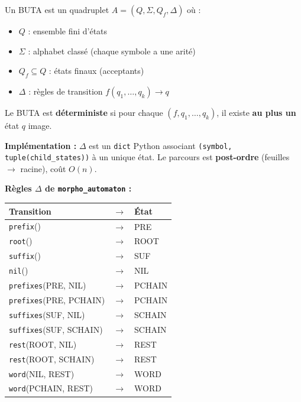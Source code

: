 \documentclass[12pt,a4paper,oneside]{scrartcl}
\begin{document}
\begin{definitionbox}
Un BUTA est un quadruplet $A = (Q, \Sigma, Q_f, \Delta)$ où :
\begin{itemize}
    \item $Q$ : ensemble fini d'états
    \item $\Sigma$ : alphabet classé (chaque symbole a une arité)
    \item $Q_f \subseteq Q$ : états finaux (acceptants)
    \item $\Delta$ : règles de transition $f(q_1, \dots, q_k) \to q$
\end{itemize}
Le BUTA est \textbf{déterministe} si pour chaque $(f, q_1, \dots, q_k)$, il existe \textbf{au plus un} état $q$ image.
\end{definitionbox}

\textbf{Implémentation :} $\Delta$ est un \texttt{dict} Python associant \texttt{(symbol, tuple(child\_states))} à un unique état. Le parcours est \textbf{post-ordre} (feuilles $\to$ racine), coût $O(n)$.

\textbf{Règles $\Delta$ de \texttt{morpho\_automaton} :}
\begin{center}
\begin{tabular}{lcl}
    \toprule
    \textbf{Transition} & $\to$ & \textbf{État} \\
    \midrule
    \texttt{prefix}() & $\to$ & PRE \\
    \texttt{root}() & $\to$ & ROOT \\
    \texttt{suffix}() & $\to$ & SUF \\
    \texttt{nil}() & $\to$ & NIL \\
    \texttt{prefixes}(PRE, NIL) & $\to$ & PCHAIN \\
    \texttt{prefixes}(PRE, PCHAIN) & $\to$ & PCHAIN \\
    \texttt{suffixes}(SUF, NIL) & $\to$ & SCHAIN \\
    \texttt{suffixes}(SUF, SCHAIN) & $\to$ & SCHAIN \\
    \texttt{rest}(ROOT, NIL) & $\to$ & REST \\
    \texttt{rest}(ROOT, SCHAIN) & $\to$ & REST \\
    \texttt{word}(NIL, REST) & $\to$ & WORD \\
    \texttt{word}(PCHAIN, REST) & $\to$ & WORD \\
    \bottomrule
\end{tabular}
\end{center}
\end{document}
